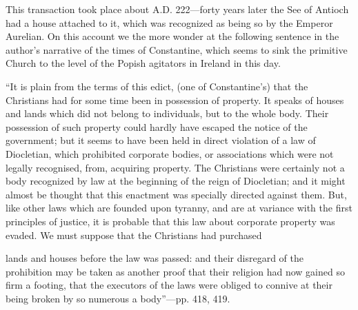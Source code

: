 This
transaction took place about A.D.
222—forty years later the See of Antioch had a house attached to it,
which was recognized as being so by the Emperor Aurelian. On this
account we the more wonder at the following sentence in the author's
narrative of the times of Constantine, which seems to sink the primitive
Church to the level of the Popish agitators in Ireland in this day.

``It is
plain from the terms of this edict, (one of Constantine's) that the
Christians had for some time been in possession of property. It speaks
of houses and lands which did not belong to individuals, but to the
whole body. Their possession of such property could hardly have escaped
the notice of the government; but it seems to have been held in direct
violation of a law of Diocletian, which prohibited corporate bodies, or
associations which were not legally recognised, from, acquiring
property. The Christians were certainly not a body recognized by law at
the beginning of the reign of Diocletian; and it might almost be thought
that this enactment was specially directed against them. But, like other
laws which are founded upon tyranny, and are at variance with the first
principles of justice, it is probable that this law about corporate
property was evaded. We must suppose that the Christians had purchased

lands and houses before the law was passed: and their disregard of
the prohibition may be taken as another proof that their religion had
now gained so firm a footing, that the executors of the laws were
obliged to connive at their being broken by so numerous a body''—pp.
418, 419.

